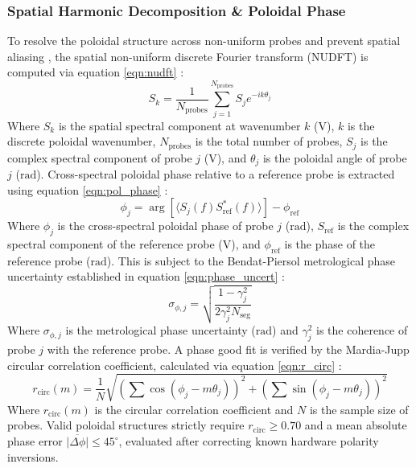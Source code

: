 \subsubsection{Spatial Harmonic Decomposition \& Poloidal Phase}
To resolve the poloidal structure across non-uniform probes and prevent spatial aliasing \cite{Varela2019}, the spatial non-uniform discrete Fourier transform (NUDFT) is computed via equation \ref{eqn:nudft} \cite{dutt1993fast}:
\begin{equation}
\label{eqn:nudft}
S_k = \frac{1}{N_{\text{probes}}} \sum_{j=1}^{N_{\text{probes}}} S_j e^{-i k \theta_j}
\end{equation}
Where $S_k$ is the spatial spectral component at wavenumber $k$ ($\text{V}$), $k$ is the discrete poloidal wavenumber, $N_{\text{probes}}$ is the total number of probes, $S_j$ is the complex spectral component of probe $j$ ($\text{V}$), and $\theta_j$ is the poloidal angle of probe $j$ ($\text{rad}$). Cross-spectral poloidal phase relative to a reference probe is extracted using equation \ref{eqn:pol_phase} \cite{Smith1971}:
\begin{equation}
\label{eqn:pol_phase}
\phi_j = \arg\left[\langle S_j(f) S_{\text{ref}}^*(f) \rangle\right] - \phi_{\text{ref}}
\end{equation}
Where $\phi_j$ is the cross-spectral poloidal phase of probe $j$ ($\text{rad}$), $S_{\text{ref}}$ is the complex spectral component of the reference probe ($\text{V}$), and $\phi_{\text{ref}}$ is the phase of the reference probe ($\text{rad}$). This is subject to the Bendat-Piersol metrological phase uncertainty established in equation \ref{eqn:phase_uncert} \cite{bendat2010random}:
\begin{equation}
\label{eqn:phase_uncert}
\sigma_{\phi, j} = \sqrt{\frac{1 - \gamma_j^2}{2 \gamma_j^2 N_{\text{seg}}}}
\end{equation}
Where $\sigma_{\phi, j}$ is the metrological phase uncertainty ($\text{rad}$) and $\gamma_j^2$ is the coherence of probe $j$ with the reference probe. A phase good fit is verified by the Mardia-Jupp circular correlation coefficient, calculated via equation \ref{eqn:r_circ} \cite{mardia2000directional}:
\begin{equation}
\label{eqn:r_circ}
r_{\text{circ}}(m) = \frac{1}{N} \sqrt{\left(\sum \cos(\phi_j - m\theta_j)\right)^2 + \left(\sum \sin(\phi_j - m\theta_j)\right)^2}
\end{equation}
Where $r_{\text{circ}}(m)$ is the circular correlation coefficient and $N$ is the sample size of probes. Valid poloidal structures strictly require $r_{\text{circ}} \ge 0.70$ and a mean absolute phase error $\overline{|\Delta\phi|} \le 45^\circ$, evaluated after correcting known hardware polarity inversions.

